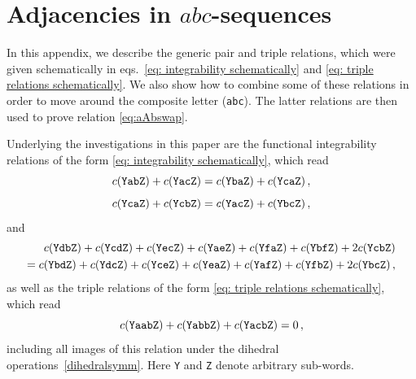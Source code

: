 \documentclass[12pt]{article}
\begin{document}
\appendix



\section{Adjacencies in \texorpdfstring{$abc$}{abc}-sequences}
\label{app: abc}


In this appendix, we describe the generic pair and triple relations, which were given schematically in eqs.~\eqref{eq: integrability schematically} and \eqref{eq: triple relations schematically}. We also show how to combine some of these relations in order to move around the composite letter ({\tt abc}).  The latter relations are then used to prove relation \ref{eq:aAbswap}.

Underlying the investigations in this paper are the functional integrability relations of the form \eqref{eq: integrability schematically}, which read \citep{Dixon:2022rse}
%
\begin{equation}
c({\tt Y ab Z})+c({\tt Y ac Z}) = c({\tt Y ba Z})+c({\tt Y caZ})\,,
\label{commute_left}
\end{equation}
\begin{equation}
c({\tt YcaZ})+c({\tt YcbZ}) = c({\tt YacZ})+c({\tt YbcZ})\,,
\label{commute_right}
\end{equation}
and 
\begin{equation}
\begin{split}
c({\tt YdbZ})+c({\tt YcdZ})+c({\tt YecZ})+c({\tt YaeZ})+c({\tt YfaZ})+c({\tt YbfZ})+2c({\tt YcbZ}) \\
=c({\tt YbdZ})+c({\tt YdcZ})+c({\tt YceZ})+c({\tt YeaZ})+c({\tt YafZ})+c({\tt YfbZ})+2c({\tt YbcZ})\,,
\end{split}
\label{eq:14terms}
\end{equation}
as well as the triple relations of the form \eqref{eq: triple relations schematically}, which read \citep{Dixon:2022rse}
\begin{equation}c({\tt YaabZ})+c({\tt YabbZ})+c({\tt YacbZ})=0\,,
    \label{triplet_rel}
\end{equation}
%
including all images of this relation under the dihedral operations~\eqref{dihedralsymm}.
Here {\tt Y} and {\tt Z} denote arbitrary sub-words.
\end{document}
